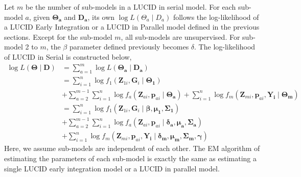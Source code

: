 Let $m$ be the number of sub-models in a LUCID in serial model. For each sub-model $a$, given $\bm{\Theta_a}$ and $\bm{D_a}$, its own $\log L({\Theta_a} \mid {D_a})$ follows the log-likelihood of a LUCID Early Integration or a LUCID in Parallel model defined in the previous sections. Except for the sub-model $m$, all sub-models are unsupervised. For sub-model 2 to $m$, the $\beta$ parameter defined previously becomes $\delta$. The log-likelihood of LUCID in Serial is constructed below,
\begin{equation}
    \begin{aligned}
         \log L(\bm{\Theta}\mid \boldsymbol{D}) & = \sum_{a = 1}^m \log L(\bm{\Theta_a}\mid \bm{D_a}) \\ &
         = \sum_{i = 1}^n \log f_1(\bm{Z}_{1i}, \bm{G}_i \mid \bm{\Theta_1}) \\ &
         + \sum_{a = 2}^{m-1} \sum_{i = 1}^n \log f_a(\bm{Z}_{ai}, \bm{p}_{ai} \mid \bm{\Theta_a}) + \sum_{i = 1}^n \log f_m(\bm{Z}_{mi}, \bm{p}_{ai}, \bm{Y_i} \mid \bm{\Theta_m}) \\ &
         = \sum_{i = 1}^n \log f_1(\bm{Z}_{1i}, \bm{G}_i \mid \bm{\beta}, \bm{\mu_1}, \bm{\Sigma_1}) \\ &
         + \sum_{a = 2}^{m-1} \sum_{i = 1}^n \log f_a(\bm{Z}_{ai}, \bm{p}_{ai} \mid \bm{\delta_a}, \bm{\mu_a}, \bm{\Sigma_a}) \\ &
         + \sum_{i = 1}^n \log f_m(\bm{Z}_{mi}, \bm{p}_{ai}, \bm{Y_i} \mid \bm{\delta_m}, \bm{\mu_m}, \bm{\Sigma_m}, \bm{\gamma})
    \end{aligned}
    \label{eq_27}
\end{equation}
Here, we assume sub-models are independent of each other. The EM algorithm of estimating the parameters of each sub-model is exactly the same as estimating a single LUCID early integration model or a LUCID in parallel model.
